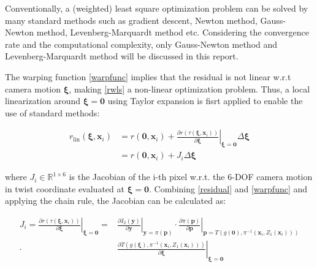 \documentclass[acmsmall, nonacm, 11pt]{acmart}
\begin{document}
Conventionally, a (weighted) least square optimization problem can be solved by many standard methods such as gradient descent, Newton method, Gauss-Newton method, Levenberg-Marquardt method etc. Considering the convergence rate and the computational complexity, only Gauss-Newton method and Levenberg-Marquardt method will be discussed in this report.

The warping function \eqref{warpfunc} implies that the residual is not linear w.r.t camera motion $\boldsymbol{\xi}$, making \eqref{rwls} a non-linear optimization problem. Thus, a local linearization around $\boldsymbol{\xi} = \mathbf{0}$ using Taylor expansion is fisrt applied to enable the use of standard methods:

\begin{equation}
\begin{aligned}
r_{\text {lin}}\left(\boldsymbol{\xi}, \mathbf{x}_{i}\right) &=r\left(\mathbf{0}, \mathbf{x}_{i}\right)+\left.\frac{\partial r\left(\tau\left(\boldsymbol{\xi}, \mathbf{x}_{i}\right)\right)}{\partial \boldsymbol{\xi}}\right|_{\boldsymbol{\xi}=\mathbf{0}} \Delta \boldsymbol{\xi} \\
&=r\left(\mathbf{0}, \mathbf{x}_{i}\right)+J_{i} \Delta \boldsymbol{\xi}
\end{aligned}
\label{linear}
\end{equation}

\noindent where $J_i \in \mathbb{R}^{1 \times 6}$ is the Jacobian of the i-th pixel w.r.t. the 6-DOF camera motion in twist coordinate evaluated at $\boldsymbol{\xi} = \mathbf{0}$. Combining \eqref{residual} and \eqref{warpfunc} and applying the chain rule, the Jacobian can be calculated as:

\begin{equation}
\begin{aligned}
J_i = \left.\frac{\partial r\left(\tau\left(\boldsymbol{\xi}, \mathbf{x}_{i}\right)\right)}{\partial \boldsymbol{\xi}}\right|_{\boldsymbol{\xi}=\mathbf{0}}
=&\left.\frac{\partial I_{2}(\mathbf{y})}{\partial \mathbf{y}}\right|_{\mathbf{y}=\pi\left(\mathbf{p}\right)} \cdot
\left.\frac{\partial \pi(\mathbf{p})}{\partial \mathbf{p}}\right|_{\mathbf{p}=T\left(g(\mathbf{0}), \pi^{-1}\left(\mathbf{x}_{i}, Z_{1}\left(\mathbf{x}_{i}\right)\right)\right)} \\
\cdot &\left.\frac{\partial T\left(g(\boldsymbol{\xi}), \pi^{-1}\left(\mathbf{x}_{i}, Z_{1}\left(\mathbf{x}_{i}\right)\right)\right)}{\partial \boldsymbol{\xi}}\right|_{\boldsymbol{\xi}=\mathbf{0}}
\end{aligned}
\label{jacob_pre}
\end{equation}
\end{document}
